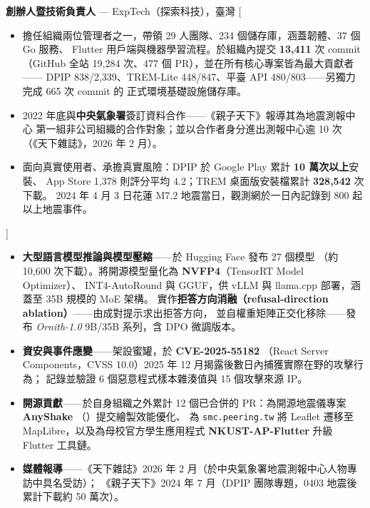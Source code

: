 \documentclass[zh]{resume}
\begin{document}
\begin{experiences}
    {\textbf{創辦人暨技術負責人} --- ExpTech（探索科技），臺灣}%
    [\begin{itemize}
      \item 擔任組織兩位管理者之一，帶領 29 人團隊、234 個儲存庫，涵蓋韌體、37 個 Go 服務、
        Flutter 用戶端與機器學習流程。於組織內提交 \textbf{13,411} 次 commit
        （GitHub 全站 19,284 次、477 個 PR），並在所有核心專案皆為最大貢獻者——
        DPIP 838/2,339、TREM-Lite 448/847、平臺 API 480/803——另獨力完成 665 次 commit 的
        正式環境基礎設施儲存庫。
      \item 2022 年底與\textbf{中央氣象署}簽訂資料合作——《親子天下》報導其為地震測報中心
        第一組非公司組織的合作對象；並以合作者身分進出測報中心逾 10 次（《天下雜誌》，2026 年 2 月）。
      \item 面向真實使用者、承擔真實風險：DPIP 於 Google Play 累計 \textbf{10 萬次以上}安裝、
        App Store 1,378 則評分平均 4.2；TREM 桌面版安裝檔累計 \textbf{328,542} 次下載。
        2024 年 4 月 3 日花蓮 M7.2 地震當日，觀測網於一日內記錄到 800 起以上地震事件。
    \end{itemize}]
\end{experiences}

\begin{itemize}
  \item \textbf{大型語言模型推論與模型壓縮}——於 Hugging Face 發布 27 個模型
    （約 10,600 次下載）。將開源模型量化為 \textbf{NVFP4}（TensorRT Model Optimizer）、
    INT4-AutoRound 與 GGUF，供 vLLM 與 llama.cpp 部署，涵蓋至 35B 規模的 MoE 架構。
    實作\textbf{拒答方向消融（refusal-direction ablation）}——由成對提示求出拒答方向，
    並自權重矩陣正交化移除——發布 \emph{Ornith-1.0} 9B/35B 系列，含 DPO 微調版本。
  \item \textbf{資安與事件應變}——架設蜜罐，於 \textbf{CVE-2025-55182}
    （React Server Components，CVSS 10.0）2025 年 12 月揭露後數日內捕獲實際在野的攻擊行為；
    記錄並驗證 6 個惡意程式樣本雜湊值與 15 個攻擊來源 IP。
  \item \textbf{開源貢獻}——於自身組織之外累計 12 個已合併的 PR：為開源地震儀專案 \textbf{AnyShake}
    （）提交繪製效能優化、
    為 \texttt{smc.peering.tw} 將 Leaflet 遷移至 MapLibre，以及為母校官方學生應用程式
    \textbf{NKUST-AP-Flutter} 升級 Flutter 工具鏈。
  \item \textbf{媒體報導}——《天下雜誌》2026 年 2 月（於中央氣象署地震測報中心人物專訪中具名受訪）；
    《親子天下》2024 年 7 月（DPIP 團隊專題，0403 地震後累計下載約 50 萬次）。
\end{itemize}
\end{document}
